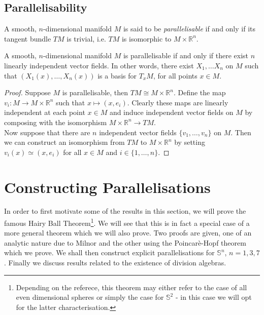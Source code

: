 \documentclass[12pt,a4paper]{article}
\begin{document}
\subsection{Parallelisability}
\begin{definition}
A smooth, $n$-dimensional manifold $M$ is said to be \textit{parallelisable} if and only if its tangent bundle $TM$ is trivial, i.e. $TM$ is isomorphic to $M\times\mathbb{R}^n$.
\end{definition}
\begin{proposition}
A smooth, $n$-dimensional manifold $M$ is parallelisable if and only if there exist $n$ linearly independent vector fields. In other words, there exist $X_1,\ldots X_n$ on $M$ such that $\left(X_1(x),\ldots, X_n(x) \right)$ is a basis for $T_xM$, for all points $x\in M$.
\label{prop:para-condn}
\end{proposition}
\begin{proof}
Suppose $M$ is parallelisable, then $TM\cong M\times\mathbb{R}^n$. Define the map $v_i:M\to M\times\mathbb{R}^n$ such that $x\mapsto (x,e_i)$. Clearly these maps are linearly independent at each point $x\in M$ and induce independent vector fields on $M$ by composing with the isomorphism $M\times \mathbb{R}^n\to TM$.\\

Now suppose that there are $n$ independent vector fields $\{v_1,\ldots,v_n\}$ on $M$. Then we can construct an isomorphism from $TM$ to $M\times\mathbb{R}^n$ by setting $v_i(x)\simeq (x,e_i)$ for all $x\in M$ and $i\in\{1,\ldots,n\}$.
\end{proof}
\pagebreak
\section{Constructing Parallelisations}
In order to first motivate some of the results in this section, we will prove the famous Hairy Ball Theorem\footnote{Depending on the referece, this theorem may either refer to the case of all even dimensional spheres or simply the case for $\mathbb{S}^2$ - in this case we will opt for the latter characterisation.}. We will see that this is in fact a special case of a more general theorem which we will also prove. Two proofs are given, one of an analytic nature due to Milnor \cite{MR505523} and the other using the Poincar\`{e}-Hopf theorem which we prove.
We shall then construct explicit parallelisations for $\mathbb{S}^n$, $n=1,3,7$. Finally we discuss results related to the existence of division algebras.
 
\end{document}
